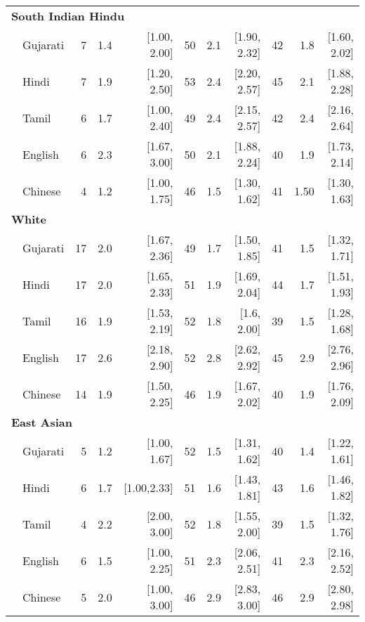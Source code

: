 \begin{table}[t]
\begin{footnotesize}
\begin{tabular}{p{.1in}lrrrrrrrrr}
\midrule
\multicolumn{11}{l}{\textbf{South Indian Hindu}}\\
 & Gujarati & 7 & 1.4 & [1.00, 2.00] & 50 & 2.1 & [1.90, 2.32] & 42 & 1.8 & [1.60, 2.02]\\

 & Hindi & 7 & 1.9 & [1.20, 2.50] & 53 & 2.4 & [2.20, 2.57] & 45 & 2.1 & [1.88, 2.28]\\

& Tamil & 6 & 1.7 & [1.00, 2.40] & 49 & 2.4 & [2.15, 2.57] & 42 & 2.4 & [2.16, 2.64]\\

 & English & 6 & 2.3 & [1.67, 3.00] & 50 & 2.1 & [1.88, 2.24] & 40 & 1.9 & [1.73, 2.14]\\

& Chinese & 4 & 1.2 & [1.00, 1.75] & 46 & 1.5 & [1.30, 1.62] & 41 & 1.50 & [1.30, 1.63]\\
\midrule
\multicolumn{11}{l}{\textbf{White}}\\
& Gujarati & 17 & 2.0 & [1.67, 2.36] & 49 & 1.7 & [1.50, 1.85] & 41 & 1.5 & [1.32, 1.71]\\

 & Hindi & 17 & 2.0 & [1.65, 2.33] & 51 & 1.9 & [1.69, 2.04] & 44 & 1.7 & [1.51, 1.93]\\

& Tamil & 16 & 1.9 & [1.53, 2.19] & 52 & 1.8 & [1.6, 2.00]& 39 & 1.5 & [1.28, 1.68]\\

 & English & 17 & 2.6 & [2.18, 2.90] & 52 & 2.8 & [2.62, 2.92] & 45 & 2.9 & [2.76, 2.96]\\
 
& Chinese & 14 & 1.9 & [1.50, 2.25] & 46 & 1.9 & [1.67, 2.02] & 40 & 1.9 & [1.76, 2.09]\\

\midrule
\multicolumn{11}{l}{\textbf{East Asian}}\\
 & Gujarati & 5 & 1.2 & [1.00, 1.67] & 52 & 1.5 & [1.31, 1.62] & 40 & 1.4 & [1.22, 1.61]\\

 & Hindi & 6 & 1.7 & [1.00,2.33] & 51 & 1.6 & [1.43, 1.81] & 43 & 1.6 & [1.46, 1.82]\\

& Tamil & 4 & 2.2 & [2.00, 3.00] & 52 & 1.8 & [1.55, 2.00]& 39 & 1.5 & [1.32, 1.76]\\
 & English & 6 & 1.5 & [1.00, 2.25] & 51 & 2.3 & [2.06, 2.51] & 41 & 2.3 & [2.16, 2.52]\\
 & Chinese & 5 & 2.0 & [1.00, 3.00] & 46 & 2.9 & [2.83, 3.00]& 46 & 2.9 & [2.80, 2.98]\\
\bottomrule
\end{tabular}
\end{footnotesize}
\end{table}